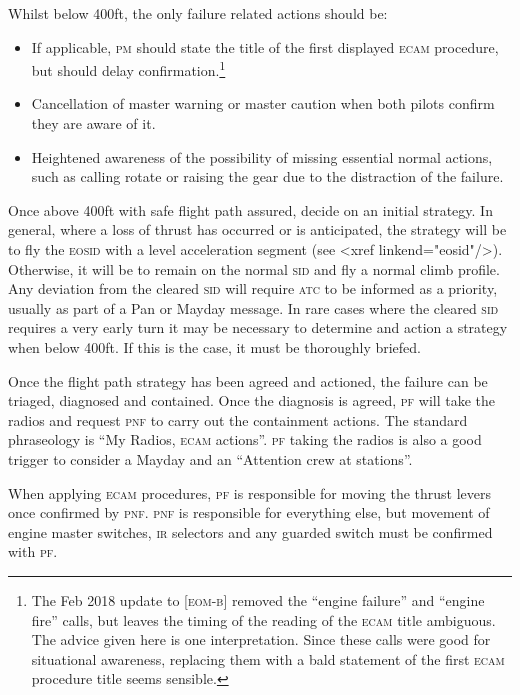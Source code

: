 \documentclass[a5paper,11pt,twoside]{book}
\newcommand{\inlcite}[1]{{\footnotesize\scshape\MakeLowercase{[#1]}}}
\newcommand{\ac}[1]{{\scshape\MakeLowercase{#1}}}
\begin{document}
Whilst below 400ft, the only failure related actions should be:
\begin{itemize}
\item If applicable, \ac{PM} should state the title of the first displayed
  \ac{ECAM} procedure, but should delay confirmation.\footnote{ The Feb 2018
  update to \inlcite{EOM-B} removed the ``engine failure'' and ``engine fire''
  calls, but leaves the timing of the reading of the \ac{ECAM} title
  ambiguous. The advice given here is one interpretation. Since these calls were
  good for situational awareness, replacing them with a bald statement of the
  first \ac{ECAM} procedure title seems sensible.}

\item Cancellation of master warning or master caution when both pilots confirm
  they are aware of it.

\item Heightened awareness of the possibility of missing essential normal
  actions, such as calling rotate or raising the gear due to the distraction of
  the failure.
\end{itemize}


Once above 400ft with safe flight path assured, decide on an initial
strategy. In general, where a loss of thrust has occurred or is anticipated, the
strategy will be to fly the \ac{EOSID} with a level acceleration segment (see
<xref linkend="eosid"/>). Otherwise, it will be to remain on the normal \ac{SID}
and fly a normal climb profile. Any deviation from the cleared \ac{SID} will
require \ac{ATC} to be informed as a priority, usually as part of a Pan or
Mayday message. In rare cases where the cleared \ac{SID} requires a very early
turn it may be necessary to determine and action a strategy when below 400ft. If
this is the case, it must be thoroughly briefed.

Once the flight path strategy has been agreed and actioned, the failure can be
triaged, diagnosed and contained. Once the diagnosis is agreed, \ac{PF} will
take the radios and request \ac{PNF} to carry out the containment actions. The
standard phraseology is ``My Radios, \ac{ECAM} actions''. \ac{PF} taking the
radios is also a good trigger to consider a Mayday and an ``Attention crew at
stations''.

When applying \ac{ECAM} procedures, \ac{PF} is responsible for moving the thrust
levers once confirmed by \ac{PNF}. \ac{PNF} is responsible for everything else,
but movement of engine master switches, \ac{IR} selectors and any guarded switch
must be confirmed with \ac{PF}.
\end{document}
